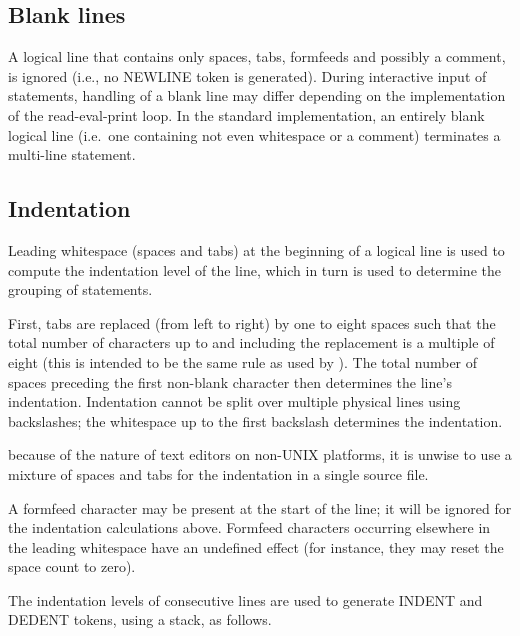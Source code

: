 \subsection{Blank lines \label{blank-lines}}

A logical line that contains only spaces, tabs, formfeeds and possibly
a comment, is ignored (i.e., no NEWLINE token is generated).  During
interactive input of statements, handling of a blank line may differ
depending on the implementation of the read-eval-print loop.  In the
standard implementation, an entirely blank logical line (i.e.\ one
containing not even whitespace or a comment) terminates a multi-line
statement.


\subsection{Indentation\label{indentation}}

Leading whitespace (spaces and tabs) at the beginning of a logical
line is used to compute the indentation level of the line, which in
turn is used to determine the grouping of statements.

First, tabs are replaced (from left to right) by one to eight spaces
such that the total number of characters up to and including the
replacement is a multiple of
eight (this is intended to be the same rule as used by \UNIX).  The
total number of spaces preceding the first non-blank character then
determines the line's indentation.  Indentation cannot be split over
multiple physical lines using backslashes; the whitespace up to the
first backslash determines the indentation.

 because of the nature of
text editors on non-UNIX platforms, it is unwise to use a mixture of
spaces and tabs for the indentation in a single source file.

A formfeed character may be present at the start of the line; it will
be ignored for the indentation calculations above.  Formfeed
characters occurring elsewhere in the leading whitespace have an
undefined effect (for instance, they may reset the space count to
zero).

The indentation levels of consecutive lines are used to generate
INDENT and DEDENT tokens, using a stack, as follows.

